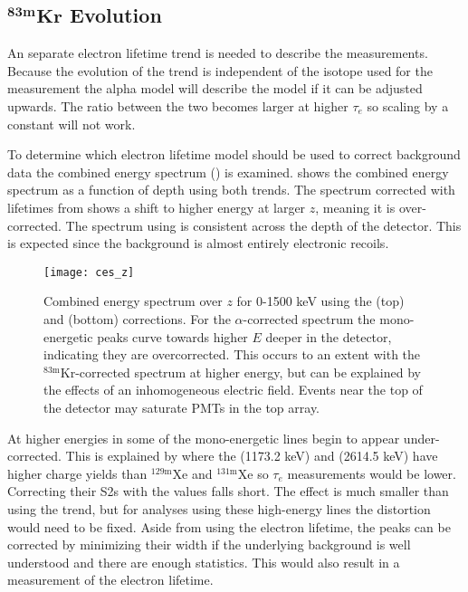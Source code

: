 \subsection[$\mathrm{^{83m}Kr}$ Evolution][$\mathrm{^{83m}Kr}$ Evolution]{$\mathbf{^{83m}Kr}$ Evolution}
\label{subsec:elifetime_fit_kr}
An separate electron lifetime trend is needed to describe the \metakr measurements.  Because the evolution of the trend is independent
of the isotope used for the measurement the alpha model will describe the \metakr model if it can be adjusted upwards.  The ratio
between the two becomes larger at higher $\tau_e$ so scaling by a constant will not work.

To determine which electron lifetime model should be used to correct background data the combined energy spectrum
() is examined.   shows the combined energy spectrum as a function
of depth using both trends.  The spectrum corrected with lifetimes from \alphadecays shows a shift to higher energy at larger $z$, meaning
it is over-corrected.  The spectrum using \metakr is consistent across the depth of the detector.  This is expected since the
background is almost entirely electronic recoils.

\begin{figure}
\centering
\texttt{[image: ces\_z]}
\caption[Combined energy spectrum over $z$ for 0-1500 keV using the \alphadecay and \metakr \stwob corrections.]{Combined energy spectrum
over $z$ for 0-1500 keV using the \alphadecay (top) and \metakr (bottom) \stwob corrections.  For the
$\alpha$-corrected spectrum the mono-energetic peaks curve towards higher $E$ deeper in the detector, indicating they are
overcorrected.  This occurs to an extent with the $\mathrm{^{83m}Kr}$-corrected spectrum at higher energy, but can be explained by the
effects of an inhomogeneous electric field.  Events near the top of the detector may saturate PMTs in the top array.}
\label{fig:elifetime_fit_kr_z_dependence}
\end{figure}

At higher energies in  some of the mono-energetic lines begin to appear under-corrected.  This
is explained by  where the  (1173.2 keV) and  (2614.5 keV)
have higher charge yields than $\mathrm{^{129m}Xe}$ and $\mathrm{^{131m}Xe}$ so $\tau_e$ measurements would be lower.  Correcting their
S2s with the \metakr values falls short.  The effect is much smaller than using the \alphadecay trend, but for analyses using these
high-energy lines the distortion would need to be fixed.  Aside from using the electron lifetime, the peaks can be corrected by minimizing
their width if the underlying background is well understood and there are enough statistics.  This would also result in a measurement of
the electron lifetime.

